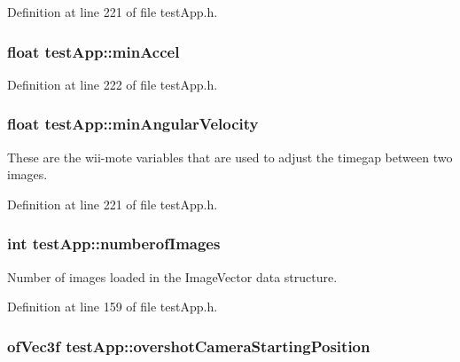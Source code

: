 Definition at line 221 of file test\-App.\-h.

\hypertarget{classtest_app_ab007edbc20b09d607f8010e2dbafdb97}{
\subsubsection[{min\-Accel}]{\setlength{\rightskip}{0pt plus 5cm}float test\-App\-::min\-Accel}}\label{classtest_app_ab007edbc20b09d607f8010e2dbafdb97}


Definition at line 222 of file test\-App.\-h.

\hypertarget{classtest_app_ac559756a01e0b98378bc29dfba9fac79}{
\subsubsection[{min\-Angular\-Velocity}]{\setlength{\rightskip}{0pt plus 5cm}float test\-App\-::min\-Angular\-Velocity}}\label{classtest_app_ac559756a01e0b98378bc29dfba9fac79}


These are the wii-\/mote variables that are used to adjust the timegap between two images. 



Definition at line 221 of file test\-App.\-h.

\hypertarget{classtest_app_a957cf7fdb3ea964a88ca1be13e4d68fc}{
\subsubsection[{numberof\-Images}]{\setlength{\rightskip}{0pt plus 5cm}int test\-App\-::numberof\-Images}}\label{classtest_app_a957cf7fdb3ea964a88ca1be13e4d68fc}


Number of images loaded in the Image\-Vector data structure. 



Definition at line 159 of file test\-App.\-h.

\hypertarget{classtest_app_a846feea7c2c4d4b1929bb72c546b3e19}{
\subsubsection[{overshot\-Camera\-Starting\-Position}]{\setlength{\rightskip}{0pt plus 5cm}of\-Vec3f test\-App\-::overshot\-Camera\-Starting\-Position}}\label{classtest_app_a846feea7c2c4d4b1929bb72c546b3e19}



